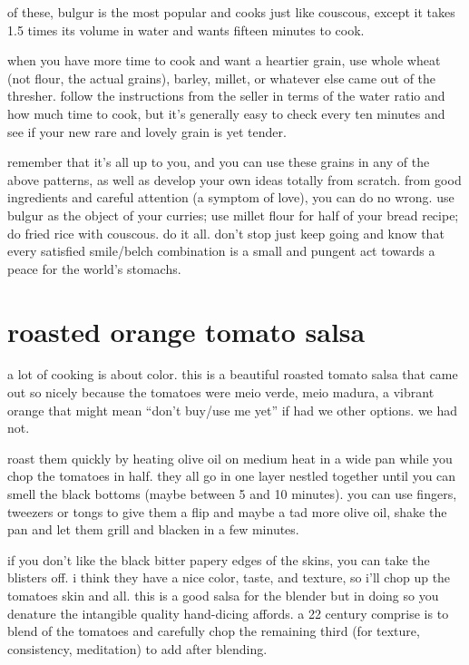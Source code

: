 of these, bulgur is the most popular and cooks just like couscous, except it 
takes 1.5 times its volume in water and wants fifteen minutes to cook.

when you have more time to cook and want a heartier grain, use whole wheat 
(not flour, the actual grains), barley, millet, or whatever else came out of 
the thresher. follow the instructions from the seller in terms of the water 
ratio and how much time to cook, but it's generally easy to check every ten 
minutes and see if your new rare and lovely grain is yet tender.

remember that it's all up to you, and you can use these grains in any of the 
above patterns, as well as develop your own ideas totally from scratch. from 
good ingredients and careful attention (a symptom of love), you can do no 
wrong. use bulgur as the object of your curries; use millet flour for half of 
your bread recipe; do fried rice with couscous. do it all. don't stop just 
keep going and know that every satisfied smile/belch combination is a small 
and pungent act towards a peace for the world's stomachs.

\section{roasted orange tomato salsa}

a lot of cooking is about color. this is a beautiful roasted tomato salsa that 
came out so nicely because the tomatoes were \gls{meio verde, meio madura}, a vibrant 
orange that might mean ``don't buy/use me yet'' if had we other options. we 
had not.

roast them quickly by heating olive oil on medium heat in a wide pan while you 
chop the tomatoes in half. they all go in one layer nestled together until you 
can smell the black bottoms (maybe between 5 and 10 minutes). you can use 
fingers, tweezers or tongs to give them a flip and maybe a tad more olive oil, 
shake the pan and let them grill and blacken in a few minutes.

if you don't like the black bitter papery edges of the skins, you can take the 
blisters off. i think they have a nice color, taste, and texture, so i'll chop 
up the tomatoes skin and all. this is a good salsa for the blender but in 
doing so you denature the intangible quality hand-dicing affords. a 
22 century comprise is to blend \twothirds of the tomatoes and 
carefully chop the remaining third (for texture, consistency, meditation) to 
add after blending.

